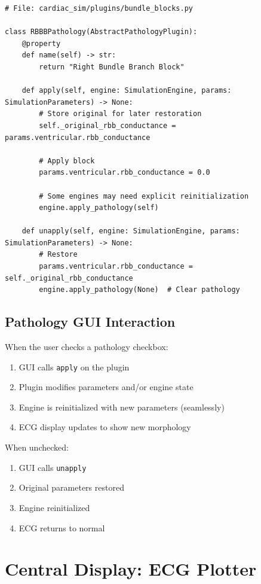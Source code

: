 \documentclass[12pt,a4paper,oneside]{book}
\begin{document}
\begin{Verbatim}[formatcom=\color{black}]
# File: cardiac_sim/plugins/bundle_blocks.py

class RBBBPathology(AbstractPathologyPlugin):
    @property
    def name(self) -> str:
        return "Right Bundle Branch Block"
    
    def apply(self, engine: SimulationEngine, params: SimulationParameters) -> None:
        # Store original for later restoration
        self._original_rbb_conductance = params.ventricular.rbb_conductance
        
        # Apply block
        params.ventricular.rbb_conductance = 0.0
        
        # Some engines may need explicit reinitialization
        engine.apply_pathology(self)
    
    def unapply(self, engine: SimulationEngine, params: SimulationParameters) -> None:
        # Restore
        params.ventricular.rbb_conductance = self._original_rbb_conductance
        engine.apply_pathology(None)  # Clear pathology
\end{Verbatim}

\subsection{Pathology GUI Interaction}

When the user checks a pathology checkbox:

\begin{enumerate}
    \item GUI calls \texttt{apply} on the plugin
    \item Plugin modifies parameters and/or engine state
    \item Engine is reinitialized with new parameters (seamlessly)
    \item ECG display updates to show new morphology
\end{enumerate}

When unchecked:

\begin{enumerate}
    \item GUI calls \texttt{unapply}
    \item Original parameters restored
    \item Engine reinitialized
    \item ECG returns to normal
\end{enumerate}

\section{Central Display: ECG Plotter}
\end{document}
